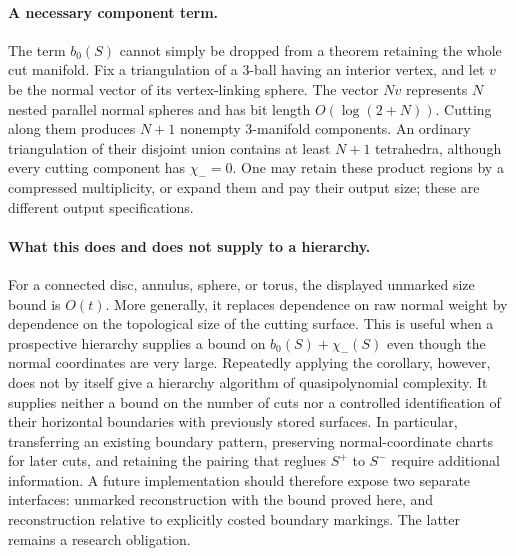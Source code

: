 \paragraph{A necessary component term.}
The term $b_0(S)$ cannot simply be dropped from a theorem retaining the whole
cut manifold.  Fix a triangulation of a $3$-ball having an interior vertex,
and let $v$ be the normal vector of its vertex-linking sphere.  The vector
$Nv$ represents $N$ nested parallel normal spheres and has bit length
$O(\log(2+N))$.  Cutting along them produces $N+1$ nonempty $3$-manifold
components.  An ordinary triangulation of their disjoint union contains at
least $N+1$ tetrahedra, although every cutting component has
$\chi_-=0$.  One may retain these product regions by a compressed
multiplicity, or expand them and pay their output size; these are different
output specifications.

\paragraph{What this does and does not supply to a hierarchy.}
For a connected disc, annulus, sphere, or torus, the displayed unmarked size
bound is $O(t)$.  More generally, it replaces dependence on raw normal
weight by dependence on the topological size of the cutting surface.  This
is useful when a prospective hierarchy supplies a bound on
$b_0(S)+\chi_-(S)$ even though the normal coordinates are very large.
Repeatedly applying the corollary, however, does not by itself give a
hierarchy algorithm of quasipolynomial complexity.  It supplies neither a
bound on the number of cuts nor a controlled identification of their
horizontal boundaries with previously stored surfaces.  In particular,
transferring an existing boundary pattern, preserving normal-coordinate
charts for later cuts, and retaining the pairing that reglues
$S^+$ to $S^-$ require additional information.  A future implementation
should therefore expose two separate interfaces: unmarked reconstruction
with the bound proved here, and reconstruction relative to explicitly
costed boundary markings.  The latter remains a research obligation.
